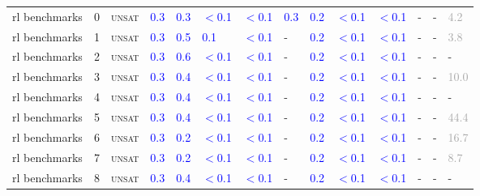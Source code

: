 \begin{center}
{\begin{longtable}{@{}llllllllllllll@{}}
rl benchmarks & 0 & \textsc{unsat} & \textcolor{blue}{0.3} & \textcolor{blue}{0.3} & \textcolor{blue}{$<$0.1} & \textcolor{blue}{$<$0.1} & \textcolor{blue}{0.3} & \textcolor{blue}{0.2} & \textcolor{blue}{$<$0.1} & \textcolor{blue}{$<$0.1} & - & - & \textcolor{darkgray}{4.2} \\
rl benchmarks & 1 & \textsc{unsat} & \textcolor{blue}{0.3} & \textcolor{blue}{0.5} & \textcolor{blue}{0.1} & \textcolor{blue}{$<$0.1} & - & \textcolor{blue}{0.2} & \textcolor{blue}{$<$0.1} & \textcolor{blue}{$<$0.1} & - & - & \textcolor{darkgray}{3.8} \\
rl benchmarks & 2 & \textsc{unsat} & \textcolor{blue}{0.3} & \textcolor{blue}{0.6} & \textcolor{blue}{$<$0.1} & \textcolor{blue}{$<$0.1} & - & \textcolor{blue}{0.2} & \textcolor{blue}{$<$0.1} & \textcolor{blue}{$<$0.1} & - & - & - \\
rl benchmarks & 3 & \textsc{unsat} & \textcolor{blue}{0.3} & \textcolor{blue}{0.4} & \textcolor{blue}{$<$0.1} & \textcolor{blue}{$<$0.1} & - & \textcolor{blue}{0.2} & \textcolor{blue}{$<$0.1} & \textcolor{blue}{$<$0.1} & - & - & \textcolor{darkgray}{10.0} \\
rl benchmarks & 4 & \textsc{unsat} & \textcolor{blue}{0.3} & \textcolor{blue}{0.4} & \textcolor{blue}{$<$0.1} & \textcolor{blue}{$<$0.1} & - & \textcolor{blue}{0.2} & \textcolor{blue}{$<$0.1} & \textcolor{blue}{$<$0.1} & - & - & - \\
rl benchmarks & 5 & \textsc{unsat} & \textcolor{blue}{0.3} & \textcolor{blue}{0.4} & \textcolor{blue}{$<$0.1} & \textcolor{blue}{$<$0.1} & - & \textcolor{blue}{0.2} & \textcolor{blue}{$<$0.1} & \textcolor{blue}{$<$0.1} & - & - & \textcolor{darkgray}{44.4} \\
rl benchmarks & 6 & \textsc{unsat} & \textcolor{blue}{0.3} & \textcolor{blue}{0.2} & \textcolor{blue}{$<$0.1} & \textcolor{blue}{$<$0.1} & - & \textcolor{blue}{0.2} & \textcolor{blue}{$<$0.1} & \textcolor{blue}{$<$0.1} & - & - & \textcolor{darkgray}{16.7} \\
rl benchmarks & 7 & \textsc{unsat} & \textcolor{blue}{0.3} & \textcolor{blue}{0.2} & \textcolor{blue}{$<$0.1} & \textcolor{blue}{$<$0.1} & - & \textcolor{blue}{0.2} & \textcolor{blue}{$<$0.1} & \textcolor{blue}{$<$0.1} & - & - & \textcolor{darkgray}{8.7} \\
rl benchmarks & 8 & \textsc{unsat} & \textcolor{blue}{0.3} & \textcolor{blue}{0.4} & \textcolor{blue}{$<$0.1} & \textcolor{blue}{$<$0.1} & - & \textcolor{blue}{0.2} & \textcolor{blue}{$<$0.1} & \textcolor{blue}{$<$0.1} & - & - & - \\

\end{longtable}}
\end{center}
